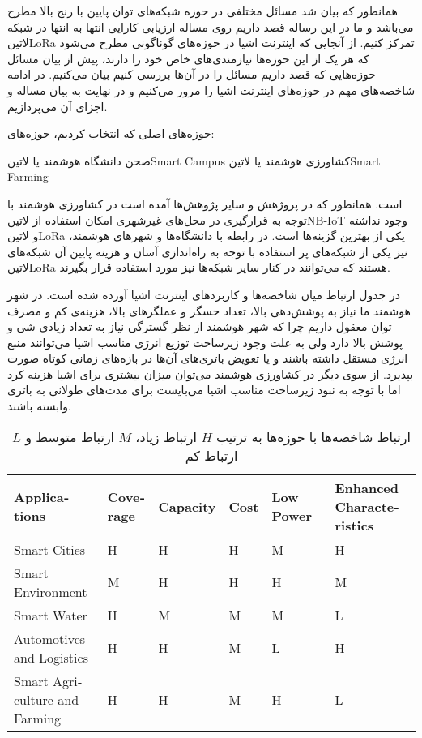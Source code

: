
همانطور که بیان شد مسائل مختلفی در حوزه شبکه‌های توان پایین با رنج بالا مطرح می‌باشد و ما در این رساله قصد داریم روی مساله ارزیابی کارایی انتها به انتها
در شبکه ‌لاتین{LoRa} تمرکز کنیم.
از آنجایی که اینترنت اشیا در حوزه‌های گوناگونی مطرح می‌شود که هر یک از این حوزه‌ها نیازمندی‌های خاص خود را دارند، پیش از بیان مسائل حوزه‌هایی که قصد داریم
مسائل را در آن‌ها بررسی کنیم بیان می‌کنیم. در ادامه شاخصه‌های مهم در حوزه‌های اینترنت اشیا را مرور می‌کنیم و در نهایت به بیان مساله و اجزای آن می‌پردازیم.

حوزه‌های اصلی که انتخاب کردیم، حوزه‌های:

 صحن دانشگاه هوشمند یا ‌لاتین{Smart Campus}
 کشاورزی هوشمند یا ‌لاتین{Smart Farming}

است. همانطور که در پروژهش  و سایر پژوهش‌ها آمده است در کشاورزی هوشمند با توجه به قرارگیری در محل‌های غیرشهری امکان استفاده
از ‌لاتین{NB-IoT} وجود نداشته و ‌لاتین{LoRa} یکی از بهترین گزینه‌ها است.
در رابطه با دانشگاه‌ها و شهرهای هوشمند، نیز یکی از شبکه‌های پر استفاده با توجه به راه‌اندازی آسان و هزینه پایین آن شبکه‌های ‌لاتین{LoRa} هستند
که می‌توانند در کنار سایر شبکه‌ها نیز مورد استفاده قرار بگیرند.

در جدول  ارتباط میان شاخصه‌ها و کاربردهای اینترنت اشیا آورده شده است.
در شهر هوشمند ما نیاز به پوشش‌دهی بالا، تعداد حسگر و عملگرهای بالا، هزینه‌ی کم و مصرف توان معقول داریم چرا
که شهر هوشمند از نظر گسترگی نیاز به تعداد زیادی شی و پوشش بالا دارد ولی به علت وجود زیرساخت توزیع انرژی مناسب
اشیا می‌توانند منبع انرژی مستقل داشته باشند و یا تعویض باتری‌های آن‌ها در بازه‌های زمانی کوتاه صورت بپذیرد.
از سوی دیگر در کشاورزی هوشمند می‌توان میزان بیشتری برای اشیا هزینه کرد اما با توجه به نبود زیرساخت مناسب
اشیا می‌بایست برای مدت‌های طولانی به باتری وابسته باشند.

\begin{table}
\label{جدول: شاخصه‌ها و کاربردها}
\caption{ارتباط شاخصه‌ها با حوزه‌ها به ترتیب $H$ ارتباط زیاد، $M$ ارتباط متوسط و $L$ ارتباط کم }
\begin{latin}\begin{tabularx}
  {\textwidth}
  {|*{6}{X|}}
  \toprule
  Applications &
  Coverage &
  Capacity &
  Cost &
  Low Power &
  Enhanced Characteristics \\
  \midrule
  Smart Cities &
  H &
  H &
  H &
  M &
  H \\
  \midrule
  Smart Environment &
  M &
  H &
  H &
  H &
  M \\
  \midrule
  Smart Water &
  H &
  M &
  M &
  M &
  L \\
  \midrule
  Automotives and Logistics &
  H &
  H &
  M &
  L &
  H \\
  \midrule
  Smart Agriculture and Farming &
  H &
  H &
  M &
  H &
  L \\
  \bottomrule
\end{tabularx}\end{latin}
\end{table}

